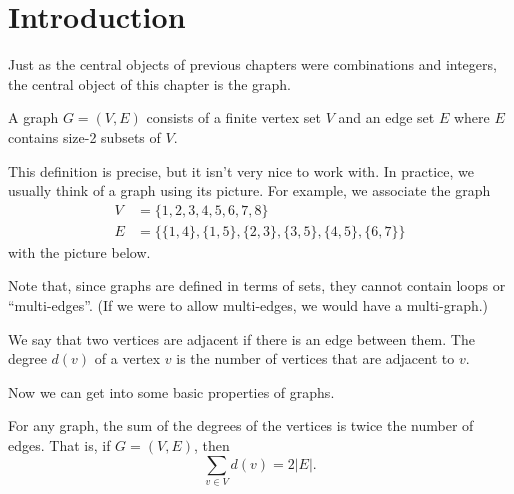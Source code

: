 \documentclass[../m55main.tex]{subfiles}
\begin{document}
\section{Introduction}
Just as the central objects of previous chapters were combinations and integers, the central object of this chapter is the graph.

\begin{definition}[Graph]
    A graph $G = (V,E)$ consists of a finite vertex set $V$ and an edge set $E$ where $E$ contains size-2 subsets of $V$.
\end{definition}

This definition is precise, but it isn't very nice to work with.
In practice, we usually think of a graph using its picture.
For example, we associate the graph
\begin{align*}
    V &= \{ 1, 2, 3, 4, 5, 6, 7, 8 \} \\
    E &= \Big\{ \{ 1,4 \}, \{ 1,5 \}, \{ 2,3 \}, \{ 3,5 \}, \{ 4,5 \}, \{ 6,7 \} \Big\}
\end{align*}
with the picture below.

\begin{center}
\end{center}

Note that, since graphs are defined in terms of sets, they cannot contain loops or ``multi-edges''.
(If we were to allow multi-edges, we would have a multi-graph.)

We say that two vertices are adjacent if there is an edge between them.
The degree $d(v)$ of a vertex $v$ is the number of vertices that are adjacent to $v$.

Now we can get into some basic properties of graphs.

\begin{lemma}
    For any graph, the sum of the degrees of the vertices is twice the number of edges.
    That is, if $G = (V,E)$, then
    \[ \sum_{v \in V} d(v) = 2 |E|. \]
\end{lemma}
\end{document}
